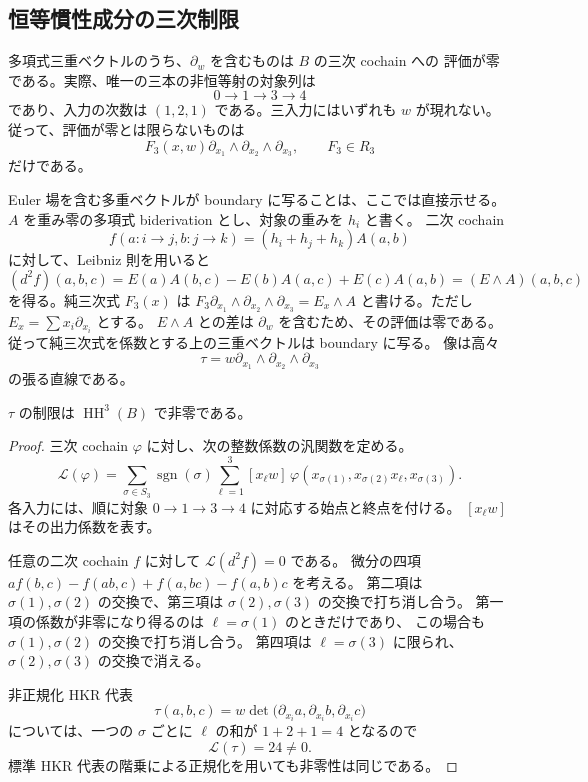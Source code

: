 \subsection{恒等慣性成分の三次制限}

多項式三重ベクトルのうち、$\partial_w$ を含むものは $B$ の三次 cochain への
評価が零である。実際、唯一の三本の非恒等射の対象列は
\[
 0\longrightarrow1\longrightarrow3\longrightarrow4
\]
であり、入力の次数は $(1,2,1)$ である。三入力にはいずれも $w$ が現れない。
従って、評価が零とは限らないものは
\[
 F_3(x,w)\partial_{x_1}\wedge\partial_{x_2}\wedge\partial_{x_3},
 \qquad F_3\in R_3
\]
だけである。

Euler 場を含む多重ベクトルが boundary に写ることは、ここでは直接示せる。
$A$ を重み零の多項式 biderivation とし、対象の重みを $h_i$ と書く。
二次 cochain
\[
 f(a:i\to j,b:j\to k)=(h_i+h_j+h_k)A(a,b)
\]
に対して、Leibniz 則を用いると
\[
 (d^2f)(a,b,c)
 =E(a)A(b,c)-E(b)A(a,c)+E(c)A(a,b)
 =(E\wedge A)(a,b,c)
\]
を得る。純三次式 $F_3(x)$ は
$F_3\partial_{x_1}\wedge\partial_{x_2}\wedge\partial_{x_3}=E_x\wedge A$
と書ける。ただし $E_x=\sum x_i\partial_{x_i}$ とする。
$E\wedge A$ との差は $\partial_w$ を含むため、その評価は零である。
従って純三次式を係数とする上の三重ベクトルは boundary に写る。
像は高々
\[
 \tau=w\partial_{x_1}\wedge\partial_{x_2}\wedge\partial_{x_3}
\]
の張る直線である。

\begin{lemma}\label{lem:v31c-functional}
$\tau$ の制限は $\operatorname{HH}^3(B)$ で非零である。
\end{lemma}
\begin{proof}
三次 cochain $\varphi$ に対し、次の整数係数の汎関数を定める。
\[
 \mathcal L(\varphi)=
 \sum_{\sigma\in S_3}\operatorname{sgn}(\sigma)
 \sum_{\ell=1}^{3}
 [x_\ell w]\,
 \varphi(x_{\sigma(1)},x_{\sigma(2)}x_\ell,x_{\sigma(3)}).
\]
各入力には、順に対象 $0\to1\to3\to4$ に対応する始点と終点を付ける。
$[x_\ell w]$ はその出力係数を表す。

任意の二次 cochain $f$ に対して $\mathcal L(d^2f)=0$ である。
微分の四項
$a f(b,c)-f(ab,c)+f(a,bc)-f(a,b)c$ を考える。
第二項は $\sigma(1),\sigma(2)$ の交換で、第三項は
$\sigma(2),\sigma(3)$ の交換で打ち消し合う。
第一項の係数が非零になり得るのは $\ell=\sigma(1)$ のときだけであり、
この場合も $\sigma(1),\sigma(2)$ の交換で打ち消し合う。
第四項は $\ell=\sigma(3)$ に限られ、$\sigma(2),\sigma(3)$ の交換で消える。

非正規化 HKR 代表
\[
 \tau(a,b,c)=w\det\bigl(\partial_{x_i}a,
                         \partial_{x_i}b,
                         \partial_{x_i}c\bigr)
\]
については、一つの $\sigma$ ごとに $\ell$ の和が $1+2+1=4$ となるので
\[
 \mathcal L(\tau)=24\ne0.
\]
標準 HKR 代表の階乗による正規化を用いても非零性は同じである。
\end{proof}


